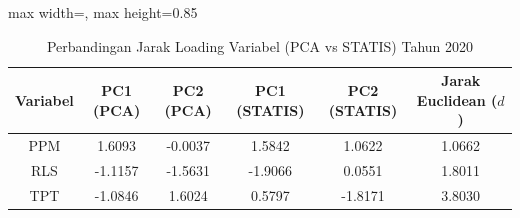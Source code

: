 \begin{table}[H]
\centering
\caption{Perbandingan Jarak Loading Variabel (PCA vs STATIS) Tahun 2020} \label{tab:samplejarak_loading_2020}
\begin{adjustbox}{max width=\textwidth, max height=0.85\textheight}
\begin{tabular}{|c|c|c|c|c|c|}
\hline
\textbf{Variabel} & \textbf{PC1 (PCA)} & \textbf{PC2 (PCA)} & \textbf{PC1 (STATIS)} & \textbf{PC2 (STATIS)} & \textbf{Jarak Euclidean ($d$)} \\
\hline
PPM & 1.6093 & -0.0037 & 1.5842 & 1.0622 & 1.0662 \\
RLS & -1.1157 & -1.5631 & -1.9066 & 0.0551 & 1.8011 \\
TPT & -1.0846 & 1.6024 & 0.5797 & -1.8171 & 3.8030 \\
\hline
\end{tabular}
\end{adjustbox}
\end{table}